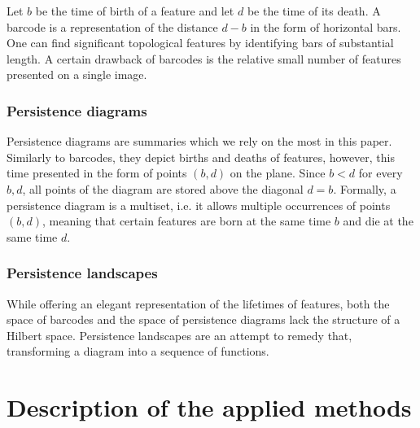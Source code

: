 \documentclass[12pt]{article}
\theoremstyle{plain}
\theoremstyle{definition}
\theoremstyle{remark}
\begin{document}
Let $b$ be the time of birth of a feature and let $d$ be the time of its death. A barcode is a representation of the distance $d-b$ in the form of horizontal bars. One can find significant topological features by identifying bars of substantial length. A certain drawback of barcodes is the relative small number of features presented on a single image.

\subsubsection{Persistence diagrams}

Persistence diagrams are summaries which we rely on the most in this paper. Similarly to barcodes, they depict births and deaths of features, however, this time presented in the form of points $(b,d)$ on the plane. Since $b<d$ for every $b,d$, all points of the diagram are stored above the diagonal $d=b$. Formally, a persistence diagram is a multiset, i.e. it allows multiple occurrences of points $(b,d)$, meaning that certain features are born at the same time $b$ and die at the same time $d$.

\subsubsection{Persistence landscapes}

While offering an elegant representation of the lifetimes of features, both the space of barcodes and the space of persistence diagrams lack the structure of a Hilbert space. Persistence landscapes are an attempt to remedy that, transforming a diagram into a sequence of functions.
	
	\section{Description of the applied methods}
\end{document}
